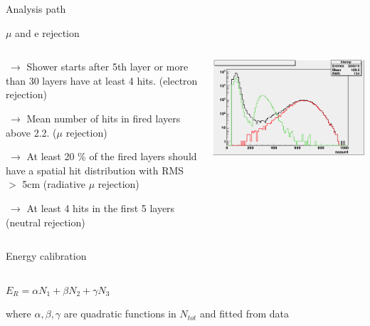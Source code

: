 \documentclass[10pt]{beamer}
\begin{document}
\begin{frame}{Analysis path}
\begin{block}{$\mu$ and e rejection}
\begin{columns}
\begin{column}{0.5\textwidth}
  {\small
    \par $ ~ \rightarrow $ Shower starts after 5th layer or more than 30 layers have at least 4 hits. (electron rejection)
    \par $ ~ \rightarrow $ Mean number of hits in fired layers above 2.2. ($\mu$ rejection)
    \par $ ~ \rightarrow $ At least 20 \% of the fired layers should have a spatial hit distribution with RMS $>$ 5cm (radiative $\mu$ rejection)
    \par $ ~ \rightarrow $ At least 4 hits in the first 5 layers (neutral rejection)   
  }  
\end{column}
\begin{column}{0.5\textwidth}

  \centerline{\includegraphics[height=0.45\textheight]{jpg/pionselection.jpg}}

\end{column}
\end{columns}

\end{block}
\pause
\begin{block}{Energy calibration}
\begin{columns}[t]
\begin{column}{0.5\textwidth}
{\small
 $ E_{R} =\alpha N_1 + \beta N_2 + \gamma N_3 $

where $ \alpha , \beta , \gamma $  are quadratic functions in $ N_{tot} $ and  fitted from data
}
\end{column}
\begin{column}{0.5\textwidth}


\end{column}
\end{columns}
\end{block}
\end{frame}
\end{document}
